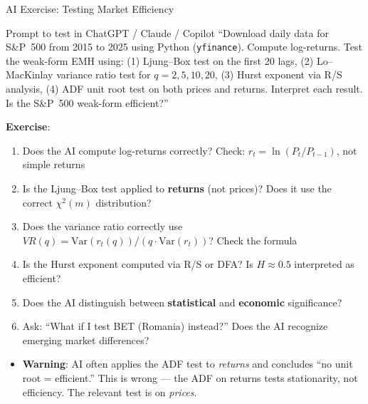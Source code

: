 \documentclass[9pt, aspectratio=169, t]{beamer}
\theoremstyle{definition}
\newenvironment{cminipage}[1]{%
    \par\noindent\hfill\begin{minipage}{#1}\ignorespaces
}{%
    \end{minipage}\hfill\null\par
}
\newcommand{\Var}{\text{Var}}
\begin{document}
\begin{frame}[shrink=3]{AI Exercise: Testing Market Efficiency}
    \begin{cminipage}{0.95\textwidth}
    \begin{block}{\footnotesize Prompt to test in ChatGPT / Claude / Copilot}
        {\small
        ``Download daily data for S\&P~500 from 2015 to 2025 using Python (\texttt{yfinance}).
        Compute log-returns. Test the weak-form EMH using: (1) Ljung--Box test on the first 20 lags,
        (2) Lo--MacKinlay variance ratio test for $q = 2, 5, 10, 20$,
        (3) Hurst exponent via R/S analysis,
        (4) ADF unit root test on both prices and returns.
        Interpret each result. Is the S\&P~500 weak-form efficient?''}
    \end{block}
    \vspace{-1mm}
    {\small
    \textbf{Exercise}:
    \begin{enumerate}
        \item Does the AI compute log-returns correctly? Check: $r_t = \ln(P_t / P_{t-1})$, not simple returns
        \item Is the Ljung--Box test applied to \textbf{returns} (not prices)? Does it use the correct $\chi^2(m)$ distribution?
        \item Does the variance ratio correctly use $VR(q) = \Var(r_t(q))/(q \cdot \Var(r_t))$? Check the formula
        \item Is the Hurst exponent computed via R/S or DFA? Is $H \approx 0.5$ interpreted as efficient?
        \item Does the AI distinguish between \textbf{statistical} and \textbf{economic} significance?
        \item Ask: ``What if I test BET (Romania) instead?'' Does the AI recognize emerging market differences?
    \end{enumerate}
    }
    \vspace{-1mm}
    \begin{alertblock}{}
        {\small
        \begin{itemize}\setlength{\itemsep}{0pt}
            \item \textbf{Warning}: AI often applies the ADF test to \textit{returns} and concludes ``no unit root = efficient.'' This is wrong --- the ADF on returns tests stationarity, not efficiency. The relevant test is on \textit{prices}.
        \end{itemize}
        }
    \end{alertblock}
    \end{cminipage}
\end{frame}
\end{document}
